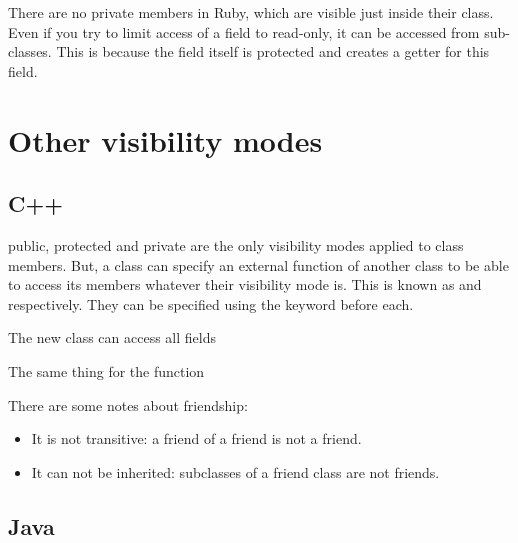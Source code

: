 \documentclass{KodeBook}
\begin{document}
There are no private members in Ruby, which are visible just inside their class. 
Even if you try to limit access of a field to read-only, it can be accessed from sub-classes. 
This is because the field itself is protected and  creates a getter for this field. 





\section{Other visibility modes}

\subsection{C++}

public, protected and private are the only visibility modes applied to class members. 
But, a class can specify an external function of another class to be able to access its members whatever their visibility mode is. 
This is known as  and  respectively. 
They can be specified using the keyword  before each. 



The new class can access all fields 



The same thing for the function



There are some notes about friendship:
\begin{itemize}
	\item It is not transitive: a friend of a friend is not a friend.
	\item It can not be inherited: subclasses of a friend class are not friends.
\end{itemize}

\subsection{Java}
\end{document}
